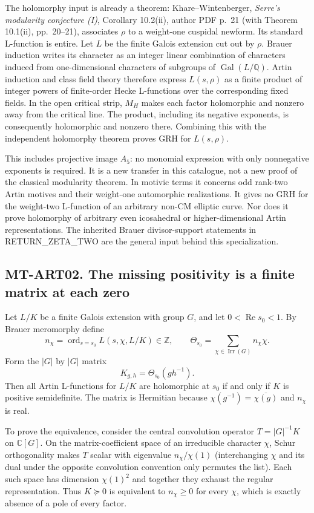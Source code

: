 The holomorphy input is already a theorem: Khare--Wintenberger,
\emph{Serre's modularity conjecture (I)}, Corollary 10.2(ii), author PDF
p.~21 (with Theorem 10.1(ii), pp.~20--21), associates $\rho$ to a weight-one
cuspidal newform.  Its standard L-function is entire.  Let $L$ be the finite
Galois extension cut out by $\rho$.  Brauer induction writes its character
as an integer linear combination of characters induced from
one-dimensional characters of subgroups of $\operatorname{Gal}(L/\mathbb Q)$.
Artin induction and class field theory therefore express $L(s,\rho)$ as
a finite product of integer powers of finite-order Hecke L-functions over
the corresponding fixed fields.  In the open critical strip, $M_H$ makes
each factor holomorphic and nonzero away from the critical line.  The
product, including its negative exponents, is consequently holomorphic and
nonzero there.  Combining this with the independent holomorphy theorem
proves GRH for $L(s,\rho)$.

This includes projective image $A_5$: no monomial expression with only
nonnegative exponents is required.  It is a new transfer in this catalogue,
not a new proof of the classical modularity theorem.  In motivic terms it
concerns odd rank-two Artin motives and their weight-one automorphic
realizations.  It gives no GRH for the weight-two L-function of an arbitrary
non-CM elliptic curve.  Nor does it prove holomorphy of arbitrary even
icosahedral or higher-dimensional Artin representations.  The inherited
Brauer divisor-support statements in RETURN\_ZETA\_TWO are the general
input behind this specialization.

\subsection*{MT-ART02. The missing positivity is a finite matrix at each zero}
Let $L/K$ be a finite Galois extension with group $G$, and let
$0<\operatorname{Re}s_0<1$.  By Brauer meromorphy define
\[
 n_\chi=\operatorname{ord}_{s=s_0}L(s,\chi,L/K)\in\mathbb Z,
 \qquad\Theta_{s_0}=\sum_{\chi\in\operatorname{Irr}(G)}n_\chi\chi.
\]
Form the $|G|$ by $|G|$ matrix
\[
 K_{g,h}=\Theta_{s_0}(g h^{-1}).
\]
Then all Artin L-functions for $L/K$ are holomorphic at $s_0$ if and only
if $K$ is positive semidefinite.  The matrix is Hermitian because
$\chi(g^{-1})=\overline{\chi(g)}$ and $n_\chi$ is real.

To prove the equivalence, consider the central convolution operator
$T=|G|^{-1}K$ on $\mathbb C[G]$.  On the matrix-coefficient space of an
irreducible character $\chi$, Schur orthogonality makes $T$ scalar with
eigenvalue $n_\chi/\chi(1)$ (interchanging $\chi$ and its dual under the
opposite convolution convention only permutes the list).  Each such space
has dimension $\chi(1)^2$ and together they exhaust the regular
representation.  Thus $K\succeq0$ is equivalent to $n_\chi\ge0$ for every
$\chi$, which is exactly absence of a pole of every factor.

